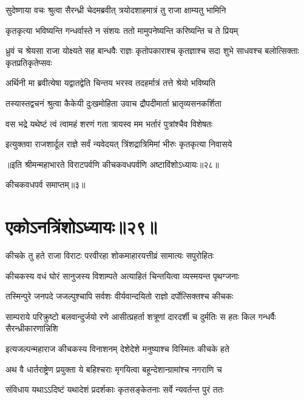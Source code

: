 
\twolineshloka
{सुदेष्णाया वचः श्रुत्वा सैरन्ध्री चेदमब्रवीत्}
{त्रयोदशाहमात्रं तु राजा क्षाम्यतु भामिनि}


\twolineshloka
{कृतकृत्या भविष्यन्ति गन्धर्वास्ते न संशयः}
{ततो मामुपनेष्यन्ति करिष्यन्ति च ते प्रियम्}


\threelineshloka
{ध्रुवं च श्रेयसा राजा योक्ष्यते सह बान्धवैः}
{राज्ञः कृतोपकाराश्च कृतज्ञाश्च सदा शुभे}
{साधवश्च बलोत्सिक्ताः कृतप्रतिकृतेप्सवः}


\twolineshloka
{अर्थिनी मा ब्रवीत्येषा यद्वातद्वेति चिन्तय}
{भरस्व तदहर्मात्रं तत्ते श्रेयो भविष्यति}



\twolineshloka
{तस्यास्तद्वचनं श्रुत्वा कैकेयी दुःखमोहिता}
{उवाच द्रौपदीमार्ता भ्रातृव्यसनकर्शिता}


\twolineshloka
{वस भद्रे यथेष्टं त्वं त्वामहं शरणं गता}
{त्रायस्व मम भर्तारं पुत्रांश्चैव विशेषतः}


\twolineshloka
{इत्युक्तवा राजशार्दूल राज्ञे सर्वं न्यवेदयत्}
{त्रिंशद्रात्रिमिमां भीरुः कृतकृत्या निवासये}

॥इति श्रीमन्महाभारते विराटपर्वणि कीचकवधपर्वणि अष्टाविंशोऽध्यायः॥२८॥ 

कीचकवधपर्व समाप्तम्॥३॥

\chapter{एकोऽनत्रिंशोऽध्यायः॥२९॥}

\twolineshloka
{कीचके तु हते राजा विराटः परवीरहा}
{शोकमाहारयत्तीव्रं सामात्यः सपुरोहितः}


\twolineshloka
{कीचकस्य वधं घोरं सानुजस्य विशाम्पते}
{अत्याहितं चिन्तयित्वा व्यस्मयन्त पृथग्जनाः}


\twolineshloka
{तस्मिन्पुरे जनपदे जजल्पुश्चापि सर्वशः}
{वीर्यवान्दयितो राज्ञो दर्पोत्सिक्तश्च कीचकः}


\threelineshloka
{साम्पराये परिक्रुष्टो बलवान्दुर्जयो रणे}
{आसीत्प्रहर्ता शत्रूणां दारदर्शी च दुर्मतिः}
{स हतः किल गन्धर्वैः सैरन्ध्रीकारणान्निशि}


\twolineshloka
{इत्यजल्पन्महाराज कीचकस्य विनाशनम्}
{देशेदेशे मनुष्याश्च विस्मितः कीचके हते}


\twolineshloka
{अथ वै धार्तराष्ट्रेण प्रयुक्ता ये बहिश्चराः}
{मृगयित्वा बहून्देशान्ग्रामांश्च नगराणि च}


\twolineshloka
{संविधाय यथाऽऽदिष्टं यथादेशं प्रदर्शकाः}
{कृतसङ्केतनाः सर्वे न्यवर्तन्त पुरं ततः}


